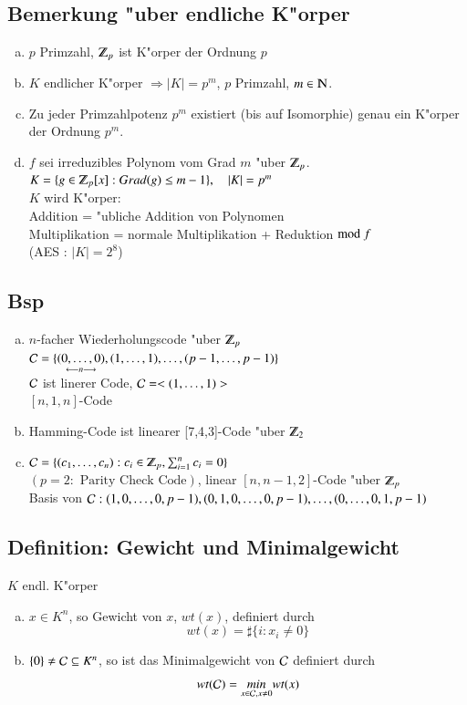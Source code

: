 \subsection{Bemerkung "uber endliche K"orper}
\begin{enumerate}[a)]
	\item $p$ Primzahl, $\Z_p$ ist K"orper der Ordnung $p$
	\item $K$ endlicher K"orper $\Rightarrow \left| K \right| = p^m$, $p$ Primzahl, $m \in \N$.
	\item Zu jeder Primzahlpotenz $p^m$ existiert (bis auf Isomorphie) genau ein K"orper der Ordnung $p^m$.
	\item $f$ sei irreduzibles Polynom vom Grad $m$ "uber $\Z_p$.\\
	 $K=\lbrace g \in \Z_p [x] : Grad(g) \leq m-1 \rbrace, \quad \left| K \right| = p^m$\\
	$K$ wird K"orper:\\
	Addition = "ubliche Addition von Polynomen \\
	Multiplikation = normale Multiplikation + Reduktion $\text{mod }f$ \\
	(AES : $\left| K \right| = 2^8$)
\end{enumerate}

\subsection{Bsp}
\begin{enumerate}[a)]
	\item $n$-facher Wiederholungscode "uber $\Z_p$\\
	$\mathcal{C}=\lbrace \underset{\longleftarrow n \longrightarrow}{(0,\ldots,0)},(1,\ldots,1),\ldots,(p-1,\ldots,p-1)\rbrace$\\
	$\mathcal{C}$ ist linerer Code, $\mathcal{C}=<(1,\ldots,1)>$\\
	$[n,1,n]$-Code
	\item Hamming-Code ist linearer [7,4,3]-Code "uber $\Z_2$
	\item $\Code = \lbrace (c_1,\ldots,c_n) : c_i \in \Z_p,\sum^n_{i=1}{c_i}=0 \rbrace$ \\
	$(p=2 : \text{ Parity Check Code})$, linear $[n,n-1,2]$-Code "uber $\Z_p$\\
	Basis von $\mathcal{C}:(1,0,\ldots,0,p-1), (0,1,0,\ldots,0,p-1), \ldots, (0,\ldots,0,1,p-1)$
\end{enumerate}
\subsection{Definition: Gewicht und Minimalgewicht}
$K$ endl. K"orper
\begin{enumerate}[a)]
	\item $x \in K^n$, so Gewicht von $x$, $wt(x)$, definiert durch 
	\[
		wt(x)=\sharp \lbrace i:x_i\neq0 \rbrace
	\]
	\item $\lbrace 0 \rbrace \neq \mathcal{C} \subseteq K^n$, so ist das Minimalgewicht von $\mathcal{C}$ definiert durch 
	\[
		wt(\mathcal{C})=\underset{x\in\mathcal{C}, x\neq 0}{min} wt(x)
	\]
\end{enumerate}

